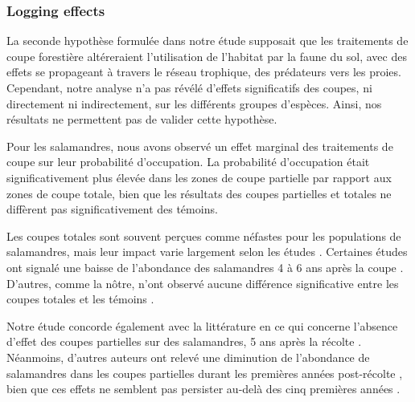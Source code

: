 \subsubsection*{Logging effects}
\label{disc:logging_effects}


La seconde hypothèse formulée dans notre étude supposait que les traitements de coupe forestière altéreraient l'utilisation de l'habitat par la faune du sol, avec des effets se propageant à 
travers le réseau trophique, des prédateurs vers les proies. 
Cependant, notre analyse n'a pas révélé d'effets significatifs des coupes, ni directement ni indirectement, sur les différents groupes d'espèces. 
Ainsi, nos résultats ne permettent pas de valider cette hypothèse.

Pour les salamandres, nous avons observé un effet marginal des traitements de coupe sur leur probabilité d'occupation. 
La probabilité d'occupation était significativement plus élevée dans les zones de coupe partielle par rapport aux zones de coupe totale, 
bien que les résultats des coupes partielles et totales ne diffèrent pas significativement des témoins.

Les coupes totales sont souvent perçues comme néfastes pour les populations de salamandres, mais leur impact varie largement selon les études \citep{Hocking2013Effectsexperimental,Chaudhary2016Impactforest}. 
Certaines études ont signalé une baisse de l'abondance des salamandres 4 à 6 ans après la coupe \citep{Petranka1993Effectstimber,Herbeck1999PlethodontidSalamander,Grialou2000effectsforest,Macneil2014Effectstimber}. 
D'autres, comme la nôtre, n'ont observé aucune différence significative entre les coupes totales et les témoins \citep{Renken2004EffectsForest,Mazerolle2021Woodlandsalamander}. 

Notre étude concorde également avec la littérature en ce qui concerne l'absence d'effet des coupes partielles sur des salamandres, 5 ans après la récolte \citep{McKenny2006Effectsstructural,Mazerolle2021Woodlandsalamander,Ochs2022Responseterrestrial}. 
Néanmoins, d'autres auteurs ont relevé une diminution de l'abondance de salamandres dans les coupes partielles durant les premières années post-récolte \citep{Harpole1999Effectsseven,Knapp2003Initialeffects,Morneault2004effectshelterwood}, 
bien que ces effets ne semblent pas persister au-delà des cinq premières années \citep{Morneault2004effectshelterwood}.

